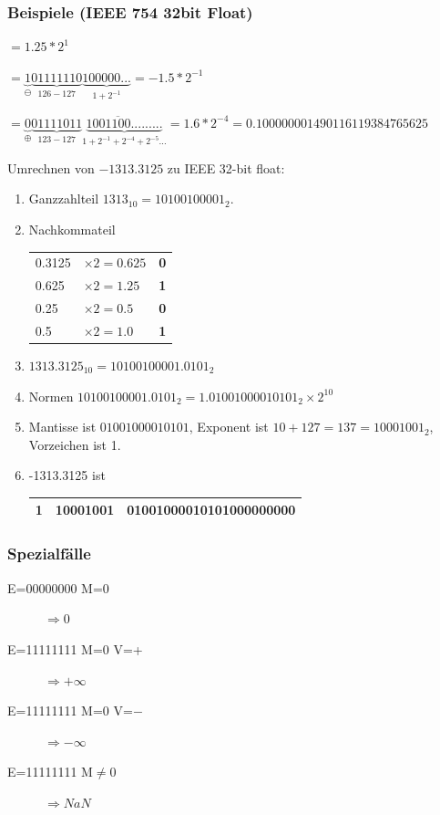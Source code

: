 \documentclass[a4paper,10pt]{article}
\newcommand{\Bold}[1]{\textbf{#1}} %
\begin{document}
\subsubsection{Beispiele (IEEE 754 32bit Float)}
\begin{description}
	\item[2.5] $=1.25*2^1$
	\item[-0.75] $=\underbrace{1}_{\ominus}\underbrace{01111110}_{126 - 127} \underbrace{100000...}_{1+2^{-1}}=-1.5*2^{-1}$
	\item[0.1] $=\underbrace{0}_{\oplus}\underbrace{01111011}_{123 - 127} \underbrace{100\overline{1100}.........}_{1+2^{-1}+2^{-4}+2^{-5}...}=1.6*2^{-4} = 0.100000001490116119384765625$ 
	\item Umrechnen von $-1313.3125$ zu IEEE 32-bit float:
	\begin{enumerate}
		\item Ganzzahlteil $1313_{10}=10100100001_2.$
		\item Nachkommateil\\
		\begin{tabular}{lll}
			0.3125&$\times2=0.625$& \Bold{0}\\
			0.625&$\times 2=1.25$ &\Bold{1}\\
			0.25&$\times 2 = 0.5$ &\Bold{0}\\
			0.5&$\times 2=1.0$ &\Bold{1}\\
		\end{tabular}
		\item $1313.3125_{10}=10100100001.0101_2$
		\item Normen $10100100001.0101_2=1.01001000010101_2\times2^{10}$
		\item Mantisse ist $01001000010101$, Exponent ist $10 + 127 = 137 = 10001001_2$, Vorzeichen ist 1.
		\item -1313.3125 ist 
		\begin{tabular}{|c|l|l|}
		\hline
		1 & 10001001 & 01001000010101000000000 \\
		\hline
	\end{tabular}
	\end{enumerate} 
\end{description}

\subsubsection{Spezialf\"alle}
\begin{description}
	\item[E=00000000 M=0] $\Rightarrow 0$
	\item[E=11111111 M=0 V=+] $\Rightarrow +\infty$
	\item[E=11111111 M=0 V=$-$] $\Rightarrow -\infty$
	\item[E=11111111 M$\neq$0] $\Rightarrow NaN$
\end{description}
\end{document}
